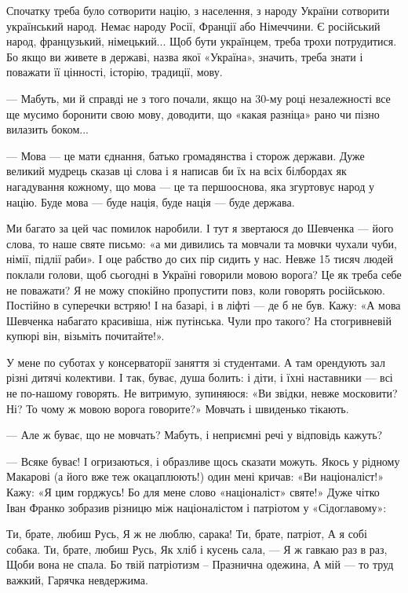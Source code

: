 \begin{longtable}
Спочатку треба було сотворити націю, з населення, з народу України сотворити
український народ. Немає народу Росії, Франції або Німеччини. Є російський
народ, французький, німецький... Щоб бути українцем, треба трохи потрудитися.
Бо якщо ви живете в державі, назва якої «Україна», значить, треба знати і
поважати її цінності, історію, традиції, мову.


— Мабуть, ми й справді не з того почали, якщо на 30-му році незалежності все ще
мусимо боронити свою мову, доводити, що «какая разніца» рано чи пізно вилазить
боком...


— Мова — це мати єднання, батько громадянства і сторож дер­жави. Дуже великий
мудрець сказав ці слова і я написав би їх на всіх білбордах як нагадування
кожному, що мова — це та першооснова, яка згуртовує народ у націю. Буде мова —
буде нація, буде нація — буде держава.


Ми багато за цей час помилок наробили. І тут я звертаюся до Шевченка — його
слова, то наше святе письмо: «а ми дивились та мовчали та мовчки чухали чуби,
німії, підлії раби». І оце рабство до сих пір сидить у нас. Невже 15 тисяч
людей поклали голови, щоб сьогодні в Україні говорили мовою ворога? Це як треба
себе не поважати? Я не можу спокійно пропустити повз, коли говорять російською.
Постійно в суперечки встряю! І на базарі, і в ліфті — де б не був. Кажу: «А
мова Шевченка набагато красивіша, ніж путінська. Чули про такого? На
стогривневій купюрі він, візьміть почитайте!».

У мене по суботах у консерваторії заняття зі студентами. А там орендують зал
різні дитячі колективи. І так, буває, душа болить: і діти, і їхні наставники —
всі не по-нашому говорять. Не витримую, зупиняюся: «Ви звідки, невже московити?
Ні? То чому ж мовою ворога говорите?» Мовчать і швиденько тікають.

— Але ж буває, що не мовчать? Мабуть, і неприємні речі у відповідь кажуть?

— Всяке буває! І огризаються, і образливе щось сказати можуть. Якось у рідному
Макарові (а його вже теж окацаплюють!) один мені кричав: «Ви націоналіст!»
Кажу: «Я цим горджусь! Бо для мене слово «націоналіст» святе!» Дуже чітко Іван
Франко зобразив різницю між націоналістом і патріотом у «Сідоглавому»:

Ти, брате, любиш Русь,
Я ж не люблю, сарака!
Ти, брате, патріот,
А я собі собака.
Ти, брате, любиш Русь,
Як хліб і кусень сала, —
Я ж гавкаю раз в раз,
Щоби вона не спала.
Бо твій патріотизм –
Празнична одежина,
А мій — то труд важкий,
Гарячка невдержима.


\end{longtable}
